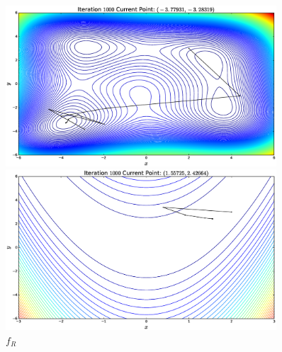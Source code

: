 \documentclass{article}
\begin{document}
\begin{flushleft}
\begin{figure}[H]
\begin{minipage}{0.45\linewidth}
\includegraphics[width=0.9\textwidth]{./images/himmelblau_inv}
\caption{\(f_{H}\)}
\end{minipage}
\hfill
\begin{minipage}{0.45\linewidth}
\includegraphics[width=0.9\textwidth]{./images/rosenbrock_inv}
\caption{\(f_{R}\)}
\end{minipage}
\end{figure}

\end{flushleft}
\end{document}
